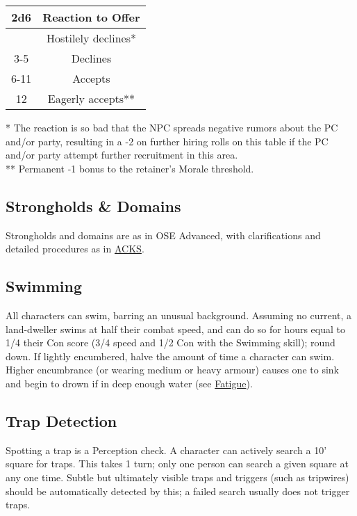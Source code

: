\documentclass{article}
\begin{document}
\begin{multicols}{2}
\begin{longtable}[]{@{}cc@{}}
\toprule\noalign{}
2d6 & Reaction to Offer \\
\midrule\noalign{}
\endhead
\bottomrule\noalign{}
\endlastfoot
2 & Hostilely declines* \\
3-5 & Declines \\
6-11 & Accepts \\
12 & Eagerly accepts** \\
\end{longtable}

* The reaction is so bad that the NPC spreads negative rumors about the
PC and/or party, resulting in a -2 on further hiring rolls on this table
if the PC and/or party attempt further recruitment in this area.\\
** Permanent -1 bonus to the retainer's Morale threshold.

\subsection{Strongholds \& Domains}\label{strongholds-domains}

Strongholds and domains are as in OSE Advanced, with clarifications and
detailed procedures as in
\href{https://alexmooney.github.io/ACKS_SRD/Chapter07.html\#strongholds-and-domains}{ACKS}.

\subsection{Swimming}\label{swimming}

All characters can swim, barring an unusual background. Assuming no
current, a land-dweller swims at half their combat speed, and can do so
for hours equal to 1/4 their Con score (3/4 speed and 1/2 Con with the
Swimming skill); round down. If lightly encumbered, halve the amount of
time a character can swim. Higher encumbrance (or wearing medium or
heavy armour) causes one to sink and begin to drown if in deep enough
water (see \hyperref[fatigue]{Fatigue}).

\subsection{Trap Detection}\label{trap-detection}

Spotting a trap is a Perception check. A character can actively search a
10' square for traps. This takes 1 turn; only one person can search a
given square at any one time. Subtle but ultimately visible traps and
triggers (such as tripwires) should be automatically detected by this; a
failed search usually does not trigger traps.


\end{multicols}
\end{document}
